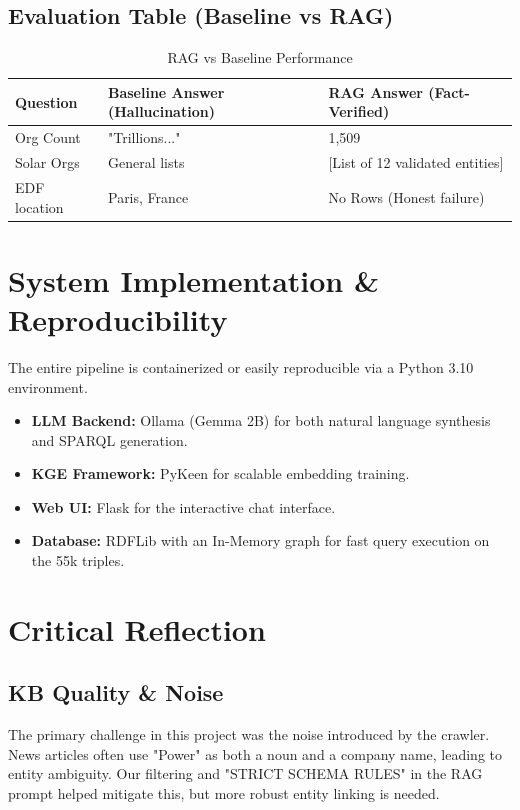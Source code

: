 \documentclass[11pt,a4paper]{article}
\begin{document}
\subsection{Evaluation Table (Baseline vs RAG)}
\begin{table}[h]
\centering
\begin{tabular}{lll}
\toprule
Question & Baseline Answer (Hallucination) & RAG Answer (Fact-Verified) \\
\midrule
Org Count & "Trillions..." & 1,509 \\
Solar Orgs & General lists & [List of 12 validated entities] \\
EDF location & Paris, France & No Rows (Honest failure) \\
\bottomrule
\end{tabular}
\caption{RAG vs Baseline Performance}
\end{table}

\section{System Implementation \& Reproducibility}
The entire pipeline is containerized or easily reproducible via a Python 3.10 environment.
\begin{itemize}
    \item \textbf{LLM Backend:} Ollama (Gemma 2B) for both natural language synthesis and SPARQL generation.
    \item \textbf{KGE Framework:} PyKeen for scalable embedding training.
    \item \textbf{Web UI:} Flask for the interactive chat interface.
    \item \textbf{Database:} RDFLib with an In-Memory graph for fast query execution on the 55k triples.
\end{itemize}

\section{Critical Reflection}
\subsection{KB Quality \& Noise}
The primary challenge in this project was the noise introduced by the crawler. News articles often use "Power" as both a noun and a company name, leading to entity ambiguity. Our filtering and "STRICT SCHEMA RULES" in the RAG prompt helped mitigate this, but more robust entity linking is needed.
\end{document}
